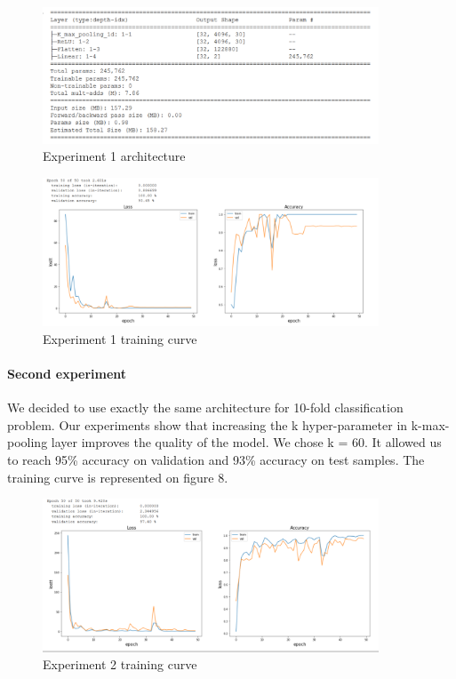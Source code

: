 \documentclass[12pt, twoside]{article}
\begin{document}
\begin{figure}[htp]
    \centering
    \includegraphics[width=10cm]{figures/figure6.pdf}
    \caption{Experiment 1 architecture}
\end{figure}
\begin{figure}[htp]
    \centering
    \includegraphics[width=10cm]{figures/figure7.pdf}
    \caption{Experiment 1 training curve}
\end{figure}

\paragraph{Second experiment}
\noindent
We decided to use exactly the same architecture for 10-fold classification problem. Our experiments show that increasing the k hyper-parameter in k-max-pooling layer improves the quality of the model. We chose k = 60. It allowed us to reach 95\% accuracy on validation and 93\% accuracy on test samples. The training curve is represented on figure 8. 

\begin{figure}[htp]
    \centering
    \includegraphics[width=10cm]{figures/figure8.pdf}
    \caption{Experiment 2 training curve}
\end{figure}
\end{document}
